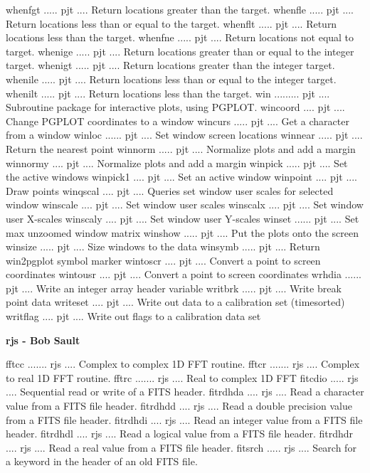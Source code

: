 {\eightpoint\begintt
whenfgt ..... pjt .... Return locations greater than the target. 
whenfle ..... pjt .... Return locations less than or equal to the target. 
whenflt ..... pjt .... Return locations less than the target. 
whenfne ..... pjt .... Return locations not equal to target. 
whenige ..... pjt .... Return locations greater than or equal to the integer target. 
\endtt}
{\eightpoint\begintt
whenigt ..... pjt .... Return locations greater than the integer target. 
whenile ..... pjt .... Return locations less than or equal to the integer target.
whenilt ..... pjt .... Return locations less than the target. 
win ......... pjt .... Subroutine package for interactive plots, using PGPLOT. 
wincoord .... pjt .... Change PGPLOT coordinates to a window 
\endtt}
{\eightpoint\begintt
wincurs ..... pjt .... Get a character from a window 
winloc ...... pjt .... Set window screen locations 
winnear ..... pjt .... Return the nearest point 
winnorm ..... pjt .... Normalize plots and add a margin 
winnormy .... pjt .... Normalize plots and add a margin 
\endtt}
{\eightpoint\begintt
winpick ..... pjt .... Set the active windows 
winpick1 .... pjt .... Set an active window 
winpoint .... pjt .... Draw points 
winqscal .... pjt .... Queries set window user scales for selected window 
winscale .... pjt .... Set window user scales 
\endtt}
{\eightpoint\begintt
winscalx .... pjt .... Set window user X-scales 
winscaly .... pjt .... Set window user Y-scales 
winset ...... pjt .... Set max unzoomed window matrix 
winshow ..... pjt .... Put the plots onto the screen 
winsize ..... pjt .... Size windows to the data 
\endtt}
{\eightpoint\begintt
winsymb ..... pjt .... Return win2pgplot symbol marker 
wintoscr .... pjt .... Convert a point to screen coordinates 
wintousr .... pjt .... Convert a point to screen coordinates 
wrhdia ...... pjt .... Write an integer array header variable 
writbrk ..... pjt .... Write break point data 
\endtt}
{\eightpoint\begintt
writeset .... pjt .... Write out data to a calibration set (timesorted) 
writflag .... pjt .... Write out flags to a calibration data set 
\endtt}
\par\centerline {\bf rjs - Bob Sault}
{\eightpoint\begintt
fftcc ....... rjs .... Complex to complex 1D FFT routine. 
fftcr ....... rjs .... Complex to real 1D FFT routine. 
fftrc ....... rjs .... Real to complex 1D FFT 
fitcdio ..... rjs .... Sequential read or write of a FITS header. 
fitrdhda .... rjs .... Read a character value from a FITS file header. 
\endtt}
{\eightpoint\begintt
fitrdhdd .... rjs .... Read a double precision value from a FITS file header. 
fitrdhdi .... rjs .... Read an integer value from a FITS file header. 
fitrdhdl .... rjs .... Read a logical value from a FITS file header. 
fitrdhdr .... rjs .... Read a real value from a FITS file header. 
fitsrch ..... rjs .... Search for a keyword in the header of an old FITS file. 
\endtt}
